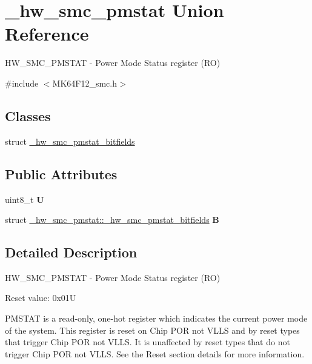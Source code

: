\hypertarget{union__hw__smc__pmstat}{}\section{\+\_\+hw\+\_\+smc\+\_\+pmstat Union Reference}
\label{union__hw__smc__pmstat}


H\+W\+\_\+\+S\+M\+C\+\_\+\+P\+M\+S\+T\+AT -\/ Power Mode Status register (RO)  




{\ttfamily \#include $<$M\+K64\+F12\+\_\+smc.\+h$>$}

\subsection*{Classes}
\begin{DoxyCompactItemize}
\item 
struct \hyperlink{struct__hw__smc__pmstat_1_1__hw__smc__pmstat__bitfields}{\+\_\+hw\+\_\+smc\+\_\+pmstat\+\_\+bitfields}
\end{DoxyCompactItemize}
\subsection*{Public Attributes}
\begin{DoxyCompactItemize}
\item 
uint8\+\_\+t {\bfseries U}\hypertarget{union__hw__smc__pmstat_afbe5cef171a775abe6f05c8970ac1eb8}{}\label{union__hw__smc__pmstat_afbe5cef171a775abe6f05c8970ac1eb8}

\item 
struct \hyperlink{struct__hw__smc__pmstat_1_1__hw__smc__pmstat__bitfields}{\+\_\+hw\+\_\+smc\+\_\+pmstat\+::\+\_\+hw\+\_\+smc\+\_\+pmstat\+\_\+bitfields} {\bfseries B}\hypertarget{union__hw__smc__pmstat_aff8ae29a355c72a7c92529d6610c1b1b}{}\label{union__hw__smc__pmstat_aff8ae29a355c72a7c92529d6610c1b1b}

\end{DoxyCompactItemize}


\subsection{Detailed Description}
H\+W\+\_\+\+S\+M\+C\+\_\+\+P\+M\+S\+T\+AT -\/ Power Mode Status register (RO) 

Reset value\+: 0x01U

P\+M\+S\+T\+AT is a read-\/only, one-\/hot register which indicates the current power mode of the system. This register is reset on Chip P\+OR not V\+L\+LS and by reset types that trigger Chip P\+OR not V\+L\+LS. It is unaffected by reset types that do not trigger Chip P\+OR not V\+L\+LS. See the Reset section details for more information. 

